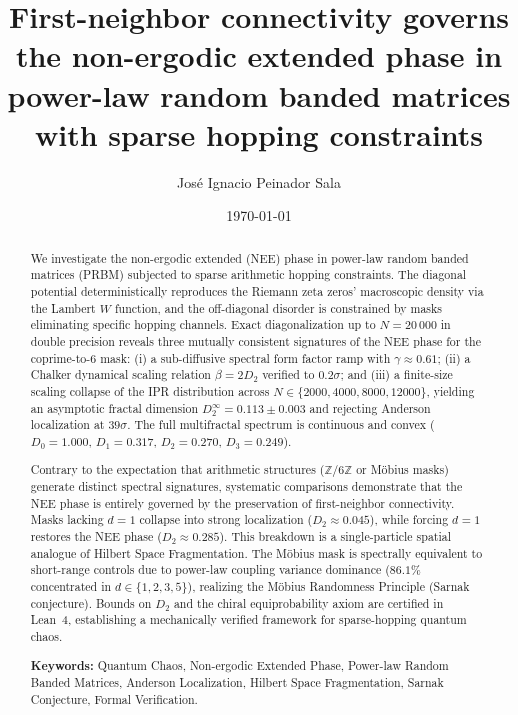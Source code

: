\documentclass[11pt,a4paper]{article}
\begin{document}
\title{\textbf{First-neighbor connectivity governs the non-ergodic extended phase in power-law random banded matrices with sparse hopping constraints}}

\author{ José Ignacio Peinador Sala }

\date{\today}

\maketitle

\begin{abstract}
We investigate the non-ergodic extended (NEE) phase in power-law random
banded matrices (PRBM) subjected to sparse arithmetic hopping constraints.
The diagonal potential deterministically reproduces the Riemann zeta zeros'
macroscopic density via the Lambert $W$ function, and the off-diagonal
disorder is constrained by masks eliminating specific hopping channels.
Exact diagonalization up to $N=20\,000$ in double precision reveals three
mutually consistent signatures of the NEE phase for the coprime-to-6 mask:
(i) a sub-diffusive spectral form factor ramp with $\gamma \approx 0.61$;
(ii) a Chalker dynamical scaling relation $\beta = 2D_2$ verified to
$0.2\sigma$; and (iii) a finite-size scaling collapse of the IPR
distribution across $N \in \{2000, 4000, 8000, 12000\}$, yielding an
asymptotic fractal dimension $D_2^\infty = 0.113 \pm 0.003$ and rejecting
Anderson localization at $39\sigma$. The full multifractal spectrum is
continuous and convex ($D_0 = 1.000$, $D_1 = 0.317$, $D_2 = 0.270$,
$D_3 = 0.249$).

Contrary to the expectation that arithmetic structures ($\mathbb{Z}/6\mathbb{Z}$
or Möbius masks) generate distinct spectral signatures, systematic
comparisons demonstrate that the NEE phase is entirely governed by the
preservation of first-neighbor connectivity. Masks lacking $d=1$ collapse
into strong localization ($D_2 \approx 0.045$), while forcing $d=1$
restores the NEE phase ($D_2 \approx 0.285$). This breakdown is a
single-particle spatial analogue of Hilbert Space Fragmentation. The
Möbius mask is spectrally equivalent to short-range controls due to
power-law coupling variance dominance ($86.1\%$ concentrated in
$d \in \{1, 2, 3, 5\}$), realizing the Möbius Randomness Principle
(Sarnak conjecture). Bounds on $D_2$ and the chiral equiprobability axiom
are certified in Lean~4, establishing a mechanically verified framework
for sparse-hopping quantum chaos.

\vspace{1em}
\noindent \textbf{Keywords:} Quantum Chaos, Non-ergodic Extended Phase,
Power-law Random Banded Matrices, Anderson Localization, Hilbert Space
Fragmentation, Sarnak Conjecture, Formal Verification.
\end{abstract}
\end{document}
